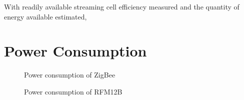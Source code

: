 
With readily available streaming cell efficiency measured and the quantity of energy available estimated, 

\section{Power Consumption}

\begin{figure}
\begin{centering}
\protect\caption{Power consumption of ZigBee}

\par\end{centering}

\end{figure}
\begin{figure}

\begin{centering}
\protect\caption{Power consumption of RFM12B}

\par\end{centering}

\end{figure}

